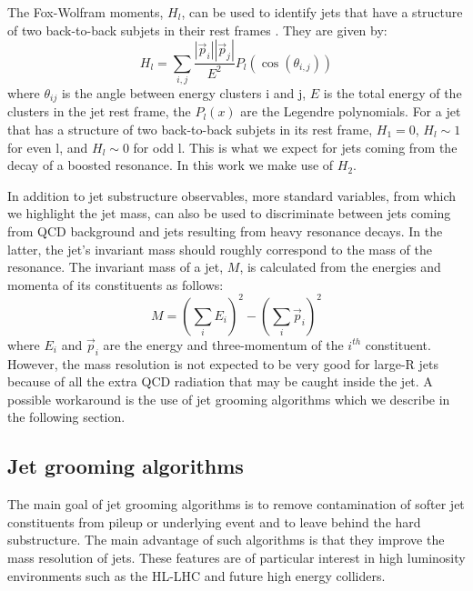 The Fox-Wolfram moments, $H_l$, can be used to identify jets that have a structure of two back-to-back subjets in their rest frames \cite{FW2}. They are given by:
\begin{equation}
H_l = \sum_{i,j}\frac{|\vec{p}_i||\vec{p}_j|}{E^2}P_l(\cos(\theta_{i,j}))
\end{equation}  
where $\theta_{ij}$ is the angle between energy clusters i and j, $E$ is the total energy of the clusters in the jet rest frame, the $P_l(x)$ are the Legendre polynomials. For a jet that has a structure of two back-to-back subjets in its rest frame, $H_1 = 0$, $H_l \sim 1$ for even l, and $H_l \sim 0$ for odd l. This is what we expect for jets coming from the decay of a boosted resonance. In this work we make use of $H_2$.

In addition to jet substructure observables, more standard variables, from which we highlight the jet mass, can also be used to discriminate between jets coming from QCD background and jets resulting from heavy resonance decays. In the latter, the jet's invariant mass should roughly correspond to the mass of the resonance. The invariant mass of a jet, $M$, is  calculated from the energies and momenta of its constituents as follows:
\begin{equation}
	M=\left(\sum_{i}E_i\right)^2-\left(\sum_{i}\vec{p}_i\right)^2
\end{equation}
where $E_i$ and $\vec{p}_i$ are the energy and three-momentum of the $i^{th}$ constituent. However, the mass resolution is not expected to be very good for large-R jets because of all the extra QCD radiation that may be caught inside the jet. A possible workaround is the use of jet grooming algorithms which we describe in the following section.

\subsection{Jet grooming algorithms}
\label{section:jet_groom}

The main goal of jet grooming algorithms is to remove contamination of softer jet constituents from pileup or underlying event and to leave behind the hard substructure. The main advantage of such algorithms is that they improve the mass resolution of jets. These features are of particular interest in high luminosity environments such as the HL-LHC and future high energy colliders. 

